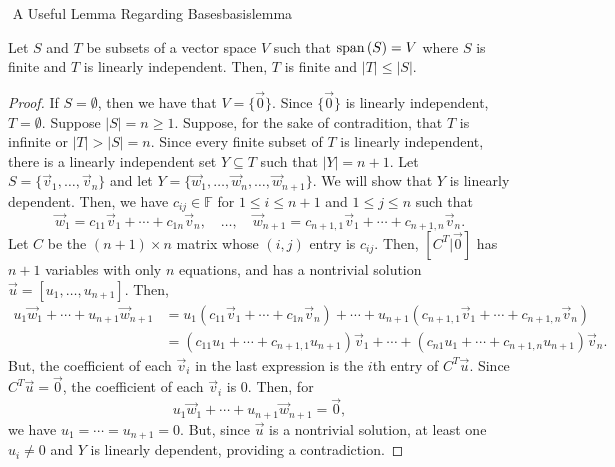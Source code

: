         \begin{theorem}{\Stop\,\,A Useful Lemma Regarding Bases}{basislemma}

            Let \(S\) and \(T\) be subsets of a vector space \(V\) such that \(\text{span\,}(S)=V\) where \(S\) is finite and \(T\) is linearly independent. Then, \(T\) is finite and \(|T|\leq|S|\).
            \begin{proof}
                If \(S=\emptyset\), then we have that \(V=\{\vec{0}\}\). Since \(\{\vec{0}\}\) is linearly independent, \(T=\emptyset\). Suppose \(|S|=n\geq1\). Suppose, for the sake of contradition, that \(T\) is infinite or \(|T|>|S|=n\). Since every finite subset of \(T\) is linearly independent, there is a linearly independent set \(Y\subseteq T\) such that \(|Y|=n+1\). Let \(S=\{\vec{v}_1,\ldots,\vec{v}_n\}\) and let \(Y=\{\vec{w}_1,\ldots,\vec{w}_n,\ldots,\vec{w}_{n+1}\}\). We will show that \(Y\) is linearly dependent. Then, we have \(c_{ij}\in\mathbb{F}\) for \(1\leq i \leq n+1\) and \(1\leq j\leq n\) such that
                \begin{equation*}
                    \vec{w}_1=c_{11}\vec{v}_1+\cdots+c_{1n}\vec{v}_n,\quad\ldots,\quad\vec{w}_{n+1}=c_{n+1,1}\vec{v}_1+\cdots+c_{n+1,n}\vec{v}_n.
                \end{equation*}
                Let \(C\) be the \((n+1)\times n\) matrix whose \((i,j)\) entry is \(c_{ij}\). Then, \([C^T|\vec{0}]\) has \(n+1\) variables with only \(n\) equations, and has a nontrivial solution \(\vec{u}=[u_1,\ldots,u_{n+1}]\). Then,
                \begin{align*}
                    u_1\vec{w}_1+\cdots+u_{n+1}\vec{w}_{n+1}&=u_1(c_{11}\vec{v}_1+\cdots+c_{1n}\vec{v}_n)+\cdots+u_{n+1}(c_{n+1,1}\vec{v}_1+\cdots+c_{n+1,n}\vec{v}_n) \\
                    &=(c_{11}u_1+\cdots+c_{n+1,1}u_{n+1})\vec{v}_1+\cdots+(c_{n1}u_1+\cdots+c_{n+1,n}u_{n+1})\vec{v}_n.
                \end{align*}
                But, the coefficient of each \(\vec{v}_i\) in the last expression is the \(i\)th entry of \(C^T\vec{u}\). Since \(C^T\vec{u}=\vec{0}\), the coefficient of each \(\vec{v}_i\) is \(0\). Then, for
                \begin{equation*}
                    u_1\vec{w}_1+\cdots+u_{n+1}\vec{w}_{n+1}=\vec{0},
                \end{equation*} 
                we have \(u_1=\cdots=u_{n+1}=0\).
                But, since \(\vec{u}\) is a nontrivial solution, at least one \(u_i\neq0\) and \(Y\) is linearly dependent, providing a contradiction.
            \end{proof}
        \end{theorem}

